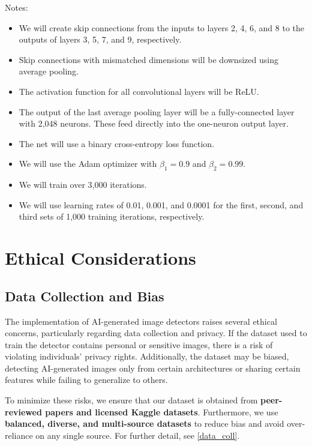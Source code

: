 \documentclass{article} %
\begin{document}
Notes:
\begin{itemize}
    \item We will create skip connections from the inputs to layers 2, 4, 6, and 8 to the outputs of layers 3, 5, 7, and 9, respectively.
    \item Skip connections with mismatched dimensions will be downsized using average pooling.
    \item The activation function for all convolutional layers will be ReLU.
    \item The output of the last average pooling layer will be a fully-connected layer with 2,048 neurons. These feed directly into the one-neuron output layer.
    \item The net will use a binary cross-entropy loss function.
    \item We will use the Adam optimizer with $\beta_1 = 0.9$ and $\beta_2=0.99$.
    \item We will train over 3,000 iterations.
    \item We will use learning rates of 0.01, 0.001, and 0.0001 for the first, second, and third sets of 1,000 training iterations, respectively.
\end{itemize}

\section{Ethical Considerations}
\label{ethical}

\subsection{Data Collection and Bias}
The implementation of AI-generated image detectors raises several ethical concerns, particularly regarding data collection and privacy. If the dataset used to train the detector contains personal or sensitive images, there is a risk of violating individuals' privacy rights. Additionally, the dataset may be biased, detecting AI-generated images only from certain architectures or sharing certain features while failing to generalize to others.

To minimize these risks, we ensure that our dataset is obtained from \textbf{peer-reviewed papers and licensed Kaggle datasets}. Furthermore, we use \textbf{balanced, diverse, and multi-source datasets} to reduce bias and avoid over-reliance on any single source. For further detail, see \ref{data_coll}.
\end{document}
